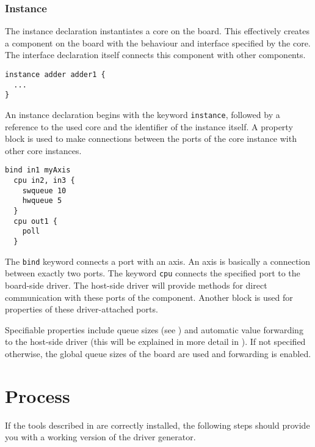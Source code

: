 \documentclass{report}
\begin{document}
\subsubsection{Instance}
The instance declaration instantiates a core on the board. This effectively creates a component on the board with the behaviour and interface specified by the core. The interface declaration itself connects this component with other components.

\begin{lstlisting}[language=bdl]
instance adder adder1 {
  ...
}
\end{lstlisting}

An instance declaration begins with the keyword \texttt{instance}, followed by a reference to the used core and the identifier of the instance itself. A property block is used to make connections between the ports of the core instance with other core instances.

\begin{lstlisting}[language=bdl]
  bind in1 myAxis
  cpu in2, in3 {
    swqueue 10
    hwqueue 5
  }
  cpu out1 {
    poll
  }
\end{lstlisting}

The \texttt{bind} keyword connects a port with an axis. An axis is basically a connection between exactly two ports.
The keyword \texttt{cpu} connects the specified port to the board-side driver. %
The host-side driver will provide methods for direct communication with these ports of the component. Another block is used for properties of these driver-attached ports.

Specifiable properties include queue sizes (see ) and automatic value forwarding to the host-side driver (this will be explained in more detail in ). If not specified otherwise, the global queue sizes of the board are used and forwarding is enabled.

\section{Process}
\label{sec:process}
If the tools described in  are correctly installed, the following steps should provide you with a working version of the driver generator.
\end{document}
